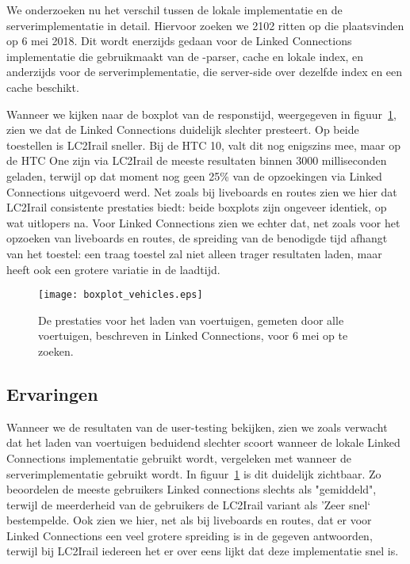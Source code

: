 We onderzoeken nu het verschil tussen de lokale implementatie en de serverimplementatie in detail. Hiervoor zoeken we 2102 ritten op die plaatsvinden op 6 mei 2018. Dit wordt enerzijds gedaan voor de Linked Connections implementatie die gebruikmaakt van de -parser, cache en lokale index, en anderzijds voor de serverimplementatie, die server-side over dezelfde index en een cache beschikt.

Wanneer we kijken naar de boxplot van de responstijd, weergegeven in figuur~\ref{fig:vehicleboxplot}, zien we dat de Linked Connections duidelijk slechter presteert. Op beide toestellen is LC2Irail sneller. Bij de HTC 10, valt dit nog enigszins mee, maar op de HTC One zijn via LC2Irail de meeste resultaten binnen 3000 milliseconden geladen, terwijl op dat moment nog geen 25\% van de opzoekingen via Linked Connections uitgevoerd werd. Net zoals bij liveboards en routes zien we hier dat LC2Irail consistente prestaties biedt: beide boxplots zijn ongeveer identiek, op wat uitlopers na. Voor Linked Connections zien we echter dat, net zoals voor het opzoeken van liveboards en routes, de spreiding van de benodigde tijd afhangt van het toestel: een traag toestel zal niet alleen trager resultaten laden, maar heeft ook een grotere variatie in de laadtijd.

\begin{figure}[h]
	\centering
	\texttt{[image: boxplot\_vehicles.eps]}
	\caption[Prestaties voor het laden van voertuigen]{De prestaties voor het laden van voertuigen, gemeten door alle voertuigen, beschreven in Linked Connections, voor 6 mei op te zoeken.}
	\label{fig:vehicleboxplot}
\end{figure}


\subsection{Ervaringen}
Wanneer we de resultaten van de user-testing bekijken, zien we zoals verwacht dat het laden van voertuigen beduidend slechter scoort wanneer de lokale Linked Connections implementatie gebruikt wordt, vergeleken met wanneer de serverimplementatie gebruikt wordt. In figuur~\ref{fig:vehicleboxplot} is dit duidelijk zichtbaar. Zo beoordelen de meeste gebruikers Linked connections slechts als "gemiddeld", terwijl de meerderheid van de gebruikers de LC2Irail variant als 'Zeer snel` bestempelde. Ook zien we hier, net als bij liveboards en routes, dat er voor Linked Connections een veel grotere spreiding is in de gegeven antwoorden, terwijl bij LC2Irail iedereen het er over eens lijkt dat deze implementatie snel is.

